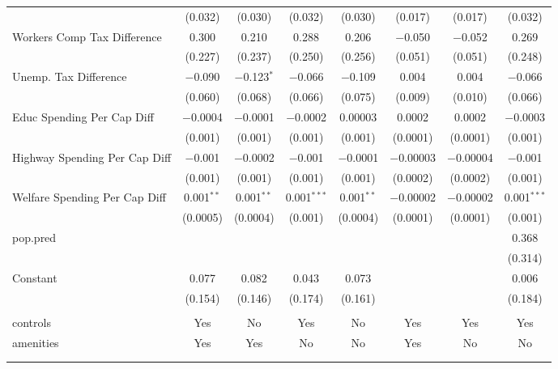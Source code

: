 \begin{table}[!htbp]
\begin{tabular}{@{\extracolsep{5pt}}lccccccc}
  & (0.032) & (0.030) & (0.032) & (0.030) & (0.017) & (0.017) & (0.032) \\ 
  Workers Comp Tax Difference & 0.300 & 0.210 & 0.288 & 0.206 & $-$0.050 & $-$0.052 & 0.269 \\ 
  & (0.227) & (0.237) & (0.250) & (0.256) & (0.051) & (0.051) & (0.248) \\ 
  Unemp. Tax Difference & $-$0.090 & $-$0.123$^{*}$ & $-$0.066 & $-$0.109 & 0.004 & 0.004 & $-$0.066 \\ 
  & (0.060) & (0.068) & (0.066) & (0.075) & (0.009) & (0.010) & (0.066) \\ 
  Educ Spending Per Cap Diff & $-$0.0004 & $-$0.0001 & $-$0.0002 & 0.00003 & 0.0002 & 0.0002 & $-$0.0003 \\ 
  & (0.001) & (0.001) & (0.001) & (0.001) & (0.0001) & (0.0001) & (0.001) \\ 
  Highway Spending Per Cap Diff & $-$0.001 & $-$0.0002 & $-$0.001 & $-$0.0001 & $-$0.00003 & $-$0.00004 & $-$0.001 \\ 
  & (0.001) & (0.001) & (0.001) & (0.001) & (0.0002) & (0.0002) & (0.001) \\ 
  Welfare Spending Per Cap Diff & 0.001$^{**}$ & 0.001$^{**}$ & 0.001$^{***}$ & 0.001$^{**}$ & $-$0.00002 & $-$0.00002 & 0.001$^{***}$ \\ 
  & (0.0005) & (0.0004) & (0.001) & (0.0004) & (0.0001) & (0.0001) & (0.001) \\ 
  pop.pred &  &  &  &  &  &  & 0.368 \\ 
  &  &  &  &  &  &  & (0.314) \\ 
  Constant & 0.077 & 0.082 & 0.043 & 0.073 &  &  & 0.006 \\ 
  & (0.154) & (0.146) & (0.174) & (0.161) &  &  & (0.184) \\ 
 \hline \\[-1.8ex] 
controls & Yes & No & Yes & No & Yes & Yes & Yes \\ 
amenities & Yes & Yes & No & No & Yes & No & No \\ 
\hline \\[-1.8ex] 
\hline 
\hline \\[-1.8ex] 
\end{tabular} 
\end{table} 
